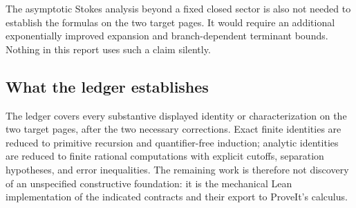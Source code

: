 The asymptotic Stokes analysis beyond a fixed closed sector is also not needed
to establish the formulas on the two target pages.  It would require an
additional exponentially improved expansion and branch-dependent terminant
bounds.  Nothing in this report uses such a claim silently.

\subsection{What the ledger establishes}

The ledger covers every substantive displayed identity or characterization on
the two target pages, after the two necessary corrections.  Exact finite
identities are reduced to primitive recursion and quantifier-free induction;
analytic identities are reduced to finite rational computations with explicit
cutoffs, separation hypotheses, and error inequalities.  The remaining work is
therefore not discovery of an unspecified constructive foundation: it is the
mechanical Lean implementation of the indicated contracts and their export to
ProveIt's  calculus.
